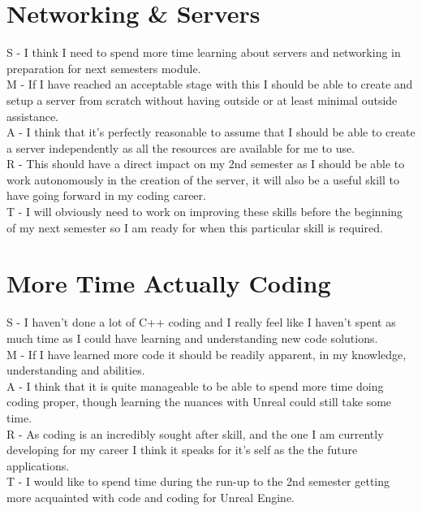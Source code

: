 \documentclass{scrartcl}
\begin{document}
\section{Networking \& Servers}
S - I think I need to spend more time learning about servers and networking in preparation for next semesters module. \\
M - If I have reached an acceptable stage with this I should be able to create and setup a server from scratch without having outside or at least minimal outside assistance.  \\
A -  I think that it's perfectly reasonable to assume that I should be able to create a server independently as all the resources are available for me to use. \\
R - This should have a direct impact on my 2nd semester as I should be able to work autonomously in the creation of the server, it will also be a useful skill to have going forward in my coding career. \\
T - I will obviously need to work on improving these skills before the beginning of my next semester so I am ready for when this particular skill is required. \\

\section{More Time Actually Coding}
S - I haven't done a lot of C++ coding and I really feel like I haven't spent as much time as I could have learning and understanding new code solutions. \\
M - If I have learned more code it should be readily apparent, in my knowledge, understanding and abilities. \\
A - I think that it is quite manageable to be able to spend more time doing coding proper, though learning the nuances with Unreal could still take some time. \\
R - As coding is an incredibly sought after skill, and the one I am currently developing for my career I think it speaks for it's self as the the future applications. \\
T - I would like to spend time during the run-up to the 2nd semester getting more acquainted with code and coding for Unreal Engine. \\
\end{document}
